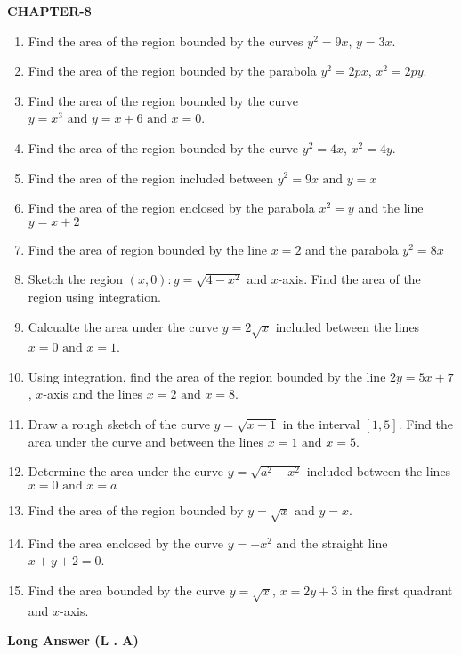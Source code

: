 \documentclass[12pt]{article}
\begin{document}
\begin{center}
\textbf{CHAPTER-8}
\end{center}
\fi
\begin{enumerate}
\item Find the area of the region bounded by the curves $y^2 = 9x$, $y = 3x$.
\item Find the area of the region bounded by the parabola $y^2 = 2px$, $x^2 = 2py$.
\item Find the area of the region bounded by the curve $y = x^3\text{ and }y = x + 6\text{ and }x = 0$.
\item Find the area of the region bounded by the curve $y^2 = 4x$, $x^2 = 4y$.
\item Find the area of the region included between $y^2 = 9x\text{ and }y =x$
\item Find the area of the region enclosed by the parabola $x^2 = y$ and the line $y = x + 2$
\item Find the area of region bounded by the line $x = 2$ and the parabola $y^2 = 8x$
\item Sketch the region ${(x,0) : y = \sqrt{4 - x^2}}$ and $x$-axis. Find the area of the region using integration.
\item Calcualte the area under the curve $y = 2\sqrt{x}$ included between the lines $x = 0\text{ and }x = 1$.
\item Using integration, find the area of the region bounded by the line $2y = 5x + 7$, $x$-axis and the lines $x = 2\text{ and }x =8$.
\item Draw a rough sketch of the curve $y = \sqrt{x - 1}$ in the interval $[1, 5]$. Find the area under the curve and between the lines $x = 1\text{ and }x = 5$.
\item Determine the area under the curve $y = \sqrt{a^2 - x^2}$ included between the lines $x = 0\text{ and }x = a$
\item Find the area of the region bounded by $y = \sqrt{x}\text{ and }y = x$.
\item Find the area enclosed by the curve $y = - x^2$ and the straight line $x + y + 2 = 0$.
\item Find the area bounded by the curve $y = \sqrt{x}$, $x = 2y + 3$ in the first quadrant and $x$-axis.
\end{enumerate}
\textbf{Long Answer (L . A)}
\end{document}
